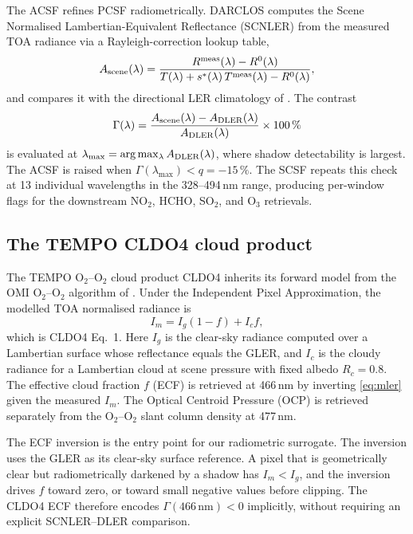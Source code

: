 \documentclass[11pt,a4paper]{article}
\begin{document}
The ACSF refines PCSF radiometrically. DARCLOS computes the Scene
Normalised Lambertian-Equivalent Reflectance (SCNLER) from the measured
TOA radiance via a Rayleigh-correction lookup table,
\begin{equation}
A_{\rm scene}(\lambda) =
\frac{R^{\rm meas}(\lambda) - R^0(\lambda)}
     {T(\lambda) + s^{\ast}(\lambda)\,T^{\rm meas}(\lambda) - R^0(\lambda)},
\label{eq:scnler}
\end{equation}
and compares it with the directional LER climatology of
\citet{tilstra2017dler}. The contrast
\begin{equation}
\Gamma(\lambda) =
\frac{A_{\rm scene}(\lambda) - A_{\rm DLER}(\lambda)}
     {A_{\rm DLER}(\lambda)} \times 100\,\%
\label{eq:gamma}
\end{equation}
is evaluated at $\lambda_{\max} = \arg\max_\lambda A_{\rm DLER}(\lambda)$,
where shadow detectability is largest. The ACSF is raised when
$\Gamma(\lambda_{\max}) < q = -15\,\%$. The SCSF repeats this check at 13
individual wavelengths in the 328--494\,nm range, producing per-window
flags for the downstream NO$_2$, HCHO, SO$_2$, and O$_3$ retrievals.

\subsection{The TEMPO CLDO4 cloud product}\label{sec:cldo4}

The TEMPO O$_2$--O$_2$ cloud product CLDO4 \citep{wang2025cldo4} inherits
its forward model from the OMI O$_2$--O$_2$ algorithm of
\citet{vasilkov2018cldo}. Under the Independent Pixel Approximation, the
modelled TOA normalised radiance is
\begin{equation}
I_m = I_g (1 - f) + I_c f,
\label{eq:mler}
\end{equation}
which is CLDO4 Eq.~1. Here $I_g$ is the clear-sky radiance computed over
a Lambertian surface whose reflectance equals the GLER, and $I_c$ is the
cloudy radiance for a Lambertian cloud at scene pressure with fixed
albedo $R_c = 0.8$. The effective cloud fraction $f$ (ECF) is retrieved
at 466\,nm by inverting \cref{eq:mler} given the measured $I_m$. The
Optical Centroid Pressure (OCP) is retrieved separately from the
O$_2$--O$_2$ slant column density at 477\,nm.

The ECF inversion is the entry point for our radiometric surrogate. The
inversion uses the GLER as its clear-sky surface reference. A pixel that
is geometrically clear but radiometrically darkened by a shadow has
$I_m < I_g$, and the inversion drives $f$ toward zero, or toward small
negative values before clipping. The CLDO4 ECF therefore encodes
$\Gamma(466\,\text{nm}) < 0$ implicitly, without requiring an explicit
SCNLER--DLER comparison.
\end{document}

